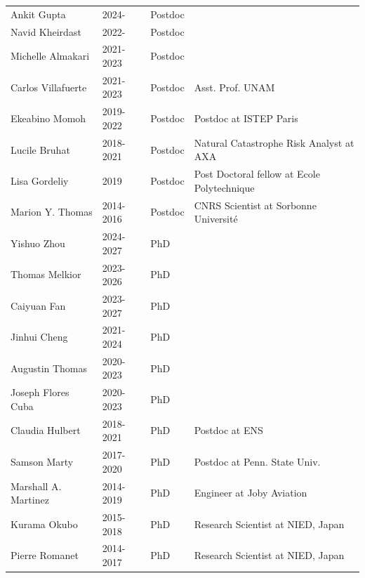 \documentclass[10pt]{article}
\begin{document}
\begin{table}[h!]
 \renewcommand{\arraystretch}{0.5}
\begin{tabular}{L{3.5cm}L{2cm}L{2cm}D{6cm}}
\color{groy}Ankit Gupta           & 2024-      &  Postdoc    &  \\
\color{groy}Navid Kheirdast       & 2022-      &  Postdoc    &  \\
\color{gray}Michelle Almakari     & 2021-2023        &  Postdoc    &  \\
\color{gray}Carlos Villafuerte    & 2021-2023        &  Postdoc    &  Asst. Prof. UNAM\\
\color{gray}Ekeabino Momoh   	  & 2019-2022         &  Postdoc    &  Postdoc at ISTEP Paris\\
\color{gray}Lucile Bruhat    	  & 2018-2021         &  Postdoc    &  Natural Catastrophe Risk Analyst at AXA\\
\color{gray}Lisa Gordeliy    	  & 2019              &  Postdoc    &  Post Doctoral fellow at Ecole Polytechnique\\
\color{gray}Marion Y. Thomas 	  & 2014-2016 &  Postdoc    &  CNRS Scientist at Sorbonne Université\\[16pt]
\color{groy}Yishuo Zhou           & 2024-2027		  &  PhD        &   \\
\color{groy}Thomas Melkior        & 2023-2026		  &  PhD        &   \\
\color{groy}Caiyuan Fan           & 2023-2027		  &  PhD        &   \\
\color{groy}Jinhui Cheng          & 2021-2024		  &  PhD        &   \\
\color{groy}Augustin Thomas       & 2020-2023		  &  PhD        &   \\
\color{gray}Joseph Flores Cuba    & 2020-2023		  &  PhD        &   \\
\color{gray}Claudia Hulbert    	  & 2018-2021         &  PhD        &  Postdoc at ENS\\
\color{gray}Samson Marty    	      & 2017-2020         &  PhD        &  Postdoc at Penn. State Univ.\\
\color{gray}Marshall A. Martinez  & 2014-2019         &  PhD        &  Engineer at Joby Aviation \\
\color{gray}Kurama Okubo    	      & 2015-2018         &  PhD        &  Research Scientist at NIED, Japan\\
\color{gray}Pierre Romanet        & 2014-2017         &  PhD        &  Research Scientist at NIED, Japan\\

\end{tabular}
\end{table}
\end{document}

